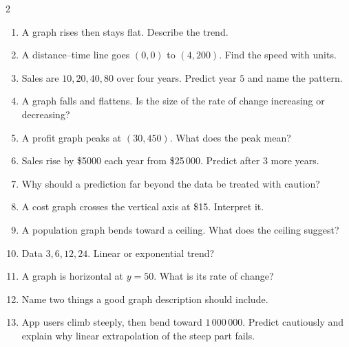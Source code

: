\documentclass[11pt]{article}
\begin{document}
\begin{recapbox}
\begin{multicols}{2}
\small
\begin{enumerate}[leftmargin=*,itemsep=3pt]
  \item A graph rises then stays flat. Describe the trend.
  \item A distance–time line goes $(0,0)$ to $(4,200)$. Find the speed with units.
  \item Sales are $10,20,40,80$ over four years. Predict year $5$ and name the pattern.
  \item A graph falls and flattens. Is the size of the rate of change increasing or decreasing?
  \item A profit graph peaks at $(30,450)$. What does the peak mean?
  \item Sales rise by \$5000 each year from \$25\,000. Predict after $3$ more years.
  \item Why should a prediction far beyond the data be treated with caution?
  \item A cost graph crosses the vertical axis at \$15. Interpret it.
  \item A population graph bends toward a ceiling. What does the ceiling suggest?
  \item Data $3,6,12,24$. Linear or exponential trend?
  \item A graph is horizontal at $y=50$. What is its rate of change?
  \item Name two things a good graph description should include.
  \item App users climb steeply, then bend toward $1\,000\,000$. Predict cautiously and explain why linear extrapolation of the steep part fails.
\end{enumerate}
\end{multicols}
\end{recapbox}
\end{document}
